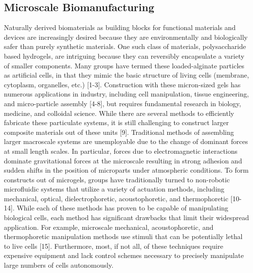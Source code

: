 \subsection{Microscale Biomanufacturing}
Naturally derived biomaterials as building blocks for functional materials and devices are increasingly desired because they are environmentally and biologically safer than purely synthetic materials. 
One such class of materials, polysaccharide based hydrogels, are intriguing because they can reversibly encapsulate a variety of smaller components. Many groups have termed these loaded-alginate particles as artificial cells, in that they mimic the basic structure of living cells (membrane, cytoplasm, organelles, etc.) \cite{chang2005therapeutic} [1-3]. 
Construction with these micron-sized gels has numerous applications in industry, including cell manipulation, tissue engineering, and micro-particle assembly [4-8], but requires fundamental research in biology, medicine, and colloidal science. 
While there are several methods to efficiently fabricate these particulate systems, it is still challenging to construct larger composite materials out of these units [9]. Traditional methods of assembling larger macroscale systems are unemployable due to the change of dominant forces at small length scales. 
In particular, forces due to electromagnetic interactions dominate gravitational forces at the microscale resulting in strong adhesion and sudden shifts in the position of microparts under atmospheric conditions. 
To form constructs out of microgels, groups have traditionally turned to non-robotic microfluidic systems that utilize a variety of actuation methods, including mechanical, optical, dielectrophoretic, acoustophoretic, and thermophoretic [10-14]. 
While each of these methods has proven to be capable of manipulating biological cells, each method has significant drawbacks that limit their widespread application. 
For example, microscale mechanical, acoustophoretic, and thermophoretic manipulation methods use stimuli that can be potentially lethal to live cells [15]. 
Furthermore, most, if not all, of these techniques require expensive equipment and lack control schemes necessary to precisely manipulate large numbers of cells autonomously.

